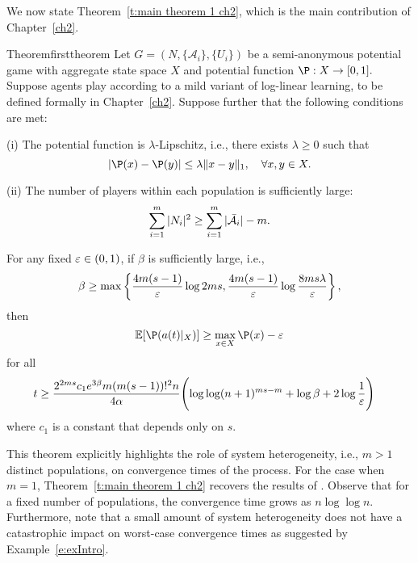 We now state Theorem~\ref{t:main theorem 1 ch2}, which is the main contribution of Chapter~\ref{ch2}.

\begin{restatable}{Theorem}{firsttheorem}\label{t:main theorem 1 ch2}
Let $G = (N,\{\mathcal{A}_i\},\{U_i\})$ be a semi-anonymous potential game with aggregate state space $X$ and potential function $\P:X\to [0,1].$ Suppose agents play according to a mild variant of log-linear learning, to be defined formally in Chapter~\ref{ch2}. Suppose further that the following conditions are met:         

\noindent (i)  The potential function is $\lambda$-Lipschitz, i.e., there exists $\lambda \geq 0$ such that
\begin{equation*}
|\P(x) - \P(y)|\leq\lambda\|x-y\|_1,\quad \forall x,y\in  X.
\end{equation*}

\noindent(ii) The number of players within each population is sufficiently large:
$$\sum_{i=1}^m |N_i|^2\geq \sum_{i=1}^m |\bar{{\cal A}}_i| - m.$$  

\noindent For any fixed $\varepsilon\in (0,1)$, if $\beta$ is sufficiently large, i.e., 
%
\begin{equation}\label{e:beta lb}
\beta\geq\max\left\{{4m(s-1)\over\varepsilon}\log 2ms,{4m(s-1)\over\varepsilon}\log{8ms \lambda\over\varepsilon}\right\},
\end{equation}
%
then
%
\begin{equation}\label{e:expected val}
\E[\P(a(t)|_{X})]\geq\max_{x\in X}\P(x)-\eps
\end{equation}
%
for all
%
\small
\begin{align}
t&\geq \frac{2^{2ms}c_1 e^{3\beta}m(m(s-1))!^2 n}{4\alpha}\Biggl(\log\log (n+1)^{ms - m} +\log\beta+ 2\log{1\over\varepsilon}\Biggr)\label{e:time requirement}
\end{align}
\normalsize
where $c_1$ is a constant that depends only on $s$.  
%
\end{restatable}

This theorem explicitly highlights the role of system heterogeneity, i.e., $m>1$ distinct populations, on convergence times of the process.  For the case when $m=1$, Theorem~\ref{t:main theorem 1 ch2} recovers the results of \cite{Shah2010}.  Observe that for a fixed number of populations, the convergence time grows as $n\log\log n$.  Furthermore, note that a small amount of system heterogeneity does not have a catastrophic impact on worst-case convergence times as suggested by Example~\ref{e:exIntro}.

